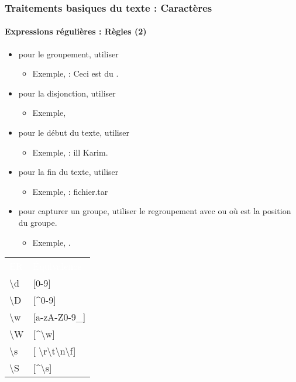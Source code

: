 \documentclass[xcolor=table]{beamer}
\begin{document}
\begin{frame}
\frametitle{Traitements basiques du texte : Caractères}
\framesubtitle{Expressions régulières : Règles (2)}

\begin{minipage}{.6\textwidth}
\begin{itemize}
	\item pour le groupement, utiliser \keyword{( )}
	\begin{itemize}
		\item Exemple,  : Ceci est du .
	\end{itemize}
	\item pour la disjonction, utiliser \keyword{\textbar}
	\begin{itemize}
		\item Exemple, 
	\end{itemize}
	\item pour le début du texte, utiliser \keyword{\textasciicircum}
	\begin{itemize}
		\item Exemple,  :  ill Karim.
	\end{itemize}
	\item pour la fin du texte, utiliser \keyword{\$}
	\begin{itemize}
		\item Exemple,  :  fichier.tar
	\end{itemize}
	\item pour capturer un groupe, utiliser le regroupement avec  ou  où  est la position du groupe.
	\begin{itemize}
		\item Exemple, .
	\end{itemize}
\end{itemize}
\end{minipage}
\begin{minipage}{.38\textwidth}
\begin{tabular}{p{}p{}}
	\rowcolor{darkblue}
	\textcolor{white}{ER} & \textcolor{white}{Équivalence} \\
	
	\textbackslash d & [0-9] \\
	\textbackslash D & [\textasciicircum 0-9] \\
	\textbackslash w & [a-zA-Z0-9\_] \\
	\textbackslash W & [\textasciicircum \textbackslash w] \\
	\textbackslash s & [ \textbackslash r\textbackslash t\textbackslash n\textbackslash f] \\
	\textbackslash S & [\textasciicircum \textbackslash s] \\
\end{tabular}

\end{minipage}

\end{frame}
\end{document}
